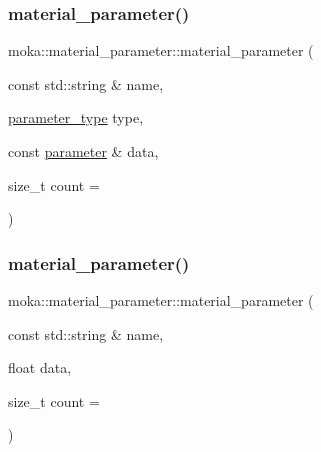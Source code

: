 \subsubsection{\texorpdfstring{material\_parameter()}{material\_parameter()}\hspace{0.1cm}{\footnotesize\ttfamily [2/20]}}
{\footnotesize\ttfamily moka\+::material\+\_\+parameter\+::material\+\_\+parameter (\begin{DoxyParamCaption}\item[{const std\+::string \&}]{name,  }\item[{\mbox{\hyperlink{namespacemoka_aed2224bc0e5b79e57a8975ded94ee1aa}{parameter\+\_\+type}}}]{type,  }\item[{const \mbox{\hyperlink{namespacemoka_afdb5f6e8afb209971d12dec045ec48ee}{parameter}} \&}]{data,  }\item[{size\+\_\+t}]{count = {} }\end{DoxyParamCaption})}

\mbox{\label{structmoka_1_1material__parameter_abec6b4aee4053145b455ab53cd5a7bac}} 
\subsubsection{\texorpdfstring{material\_parameter()}{material\_parameter()}\hspace{0.1cm}{\footnotesize\ttfamily [3/20]}}
{\footnotesize\ttfamily moka\+::material\+\_\+parameter\+::material\+\_\+parameter (\begin{DoxyParamCaption}\item[{const std\+::string \&}]{name,  }\item[{float}]{data,  }\item[{size\+\_\+t}]{count = {} }\end{DoxyParamCaption})}

\mbox{\label{structmoka_1_1material__parameter_a6e86cf0f01e3b243a160d7d0cce0508a}} 
